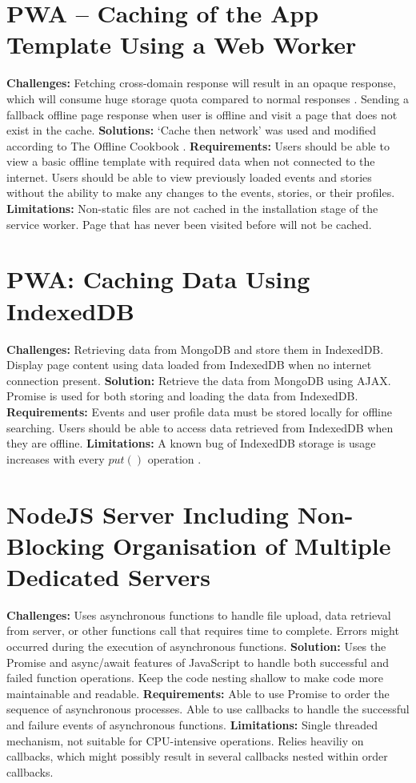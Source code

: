 \documentclass[11pt, a4paper]{article}
\begin{document}
\section{PWA – Caching of the App Template Using a Web Worker}
\textbf{Challenges:} Fetching cross-domain response will result in an opaque response, which will
consume huge storage quota compared to normal responses \cite{opaque_workbox}. Sending a fallback
offline page response when user is offline and visit a page that does not exist in the cache.
\textbf{Solutions:} `Cache then network' was used and modified according to The Offline Cookbook
\cite{offline_cookbook}. \textbf{Requirements:} Users should be able to view a basic offline
template with required data when not connected to the internet. Users should be able to view
previously loaded events and stories without the ability to make any changes to the events, stories,
or their profiles. \textbf{Limitations:} Non-static files are not cached in the installation stage
of the service worker. Page that has never been visited before will not be cached.

\section{PWA: Caching Data Using IndexedDB}
\textbf{Challenges:} Retrieving data from MongoDB and store them in IndexedDB. Display page content
using data loaded from IndexedDB when no internet connection present. \textbf{Solution:} Retrieve
the data from MongoDB using AJAX. Promise is used for both storing and loading the data from
IndexedDB. \textbf{Requirements:} Events and user profile data must be stored locally for offline
searching. Users should be able to access data retrieved from IndexedDB when they are offline.
\textbf{Limitations:} A known bug of IndexedDB storage is usage increases with every $put()$
operation \cite{leveldb_593, leveldb_603}.

\section{NodeJS Server Including Non-Blocking Organisation of Multiple Dedicated Servers}
\textbf{Challenges:} Uses asynchronous functions to handle file upload, data retrieval from server,
or other functions call that requires time to complete. Errors might occurred during the execution
of asynchronous functions. \textbf{Solution:} Uses the Promise and async/await features of
JavaScript to handle both successful and failed function operations. Keep the code nesting shallow
to make code more maintainable and readable. \textbf{Requirements:} Able to use Promise to order the
sequence of asynchronous processes. Able to use callbacks to handle the successful and failure
events of asynchronous functions. \textbf{Limitations:} Single threaded mechanism, not suitable for
CPU-intensive operations. Relies heaviliy on callbacks, which might possibly result in several
callbacks nested within order callbacks.
\end{document}
